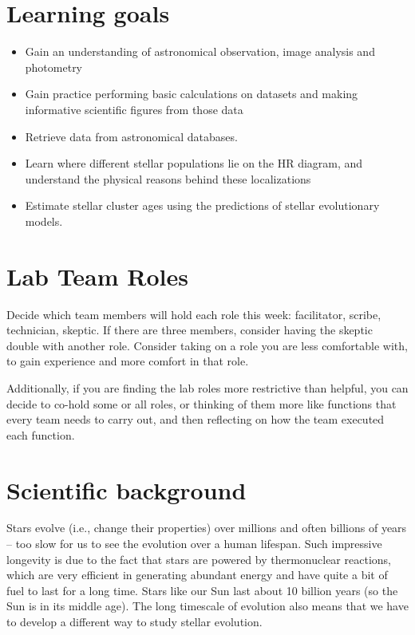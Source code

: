 \section{Learning goals}

\begin{itemize}
    \item Gain an understanding of astronomical observation, image analysis and photometry
	\item Gain practice performing basic calculations on datasets and making informative scientific figures from those data
	\item Retrieve data from astronomical databases.
	\item Learn where different stellar populations lie on the HR diagram, and understand the physical reasons behind these localizations
	\item Estimate stellar cluster ages using the predictions of stellar evolutionary models. 
\end{itemize}


\section{Lab Team Roles}

Decide which team members will hold each role this week: facilitator, scribe, technician, skeptic. If there are three members, consider having the skeptic double with another role. Consider taking on a role you are less comfortable with, to gain experience and more comfort in that role.

Additionally, if you are finding the lab roles more restrictive than helpful, you can decide to co-hold some or all roles, or thinking of them more like functions that every team needs to carry out, and then reflecting on how the team executed each function.

\section{Scientific background}

Stars evolve (i.e., change their properties) over millions and often billions of years – too slow for us to see the evolution over a human lifespan.  Such impressive longevity is due to the fact that stars are powered by thermonuclear reactions, which are very efficient in generating abundant energy and have quite a bit of fuel to last for a long time. Stars like our Sun last about 10 billion years (so the Sun is in its middle age). The long timescale of evolution also means that we have to develop a different way to study stellar evolution. 

